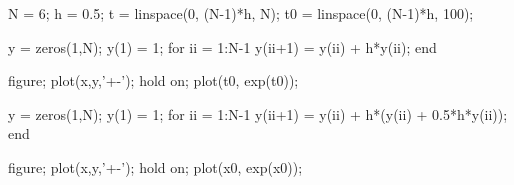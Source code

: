 N = 6;
h = 0.5;
t = linspace(0, (N-1)*h, N); %
t0 = linspace(0, (N-1)*h, 100); %

y = zeros(1,N); %
y(1) = 1; %
for ii = 1:N-1
    y(ii+1) = y(ii) + h*y(ii);
end

figure;
plot(x,y,'+-');
hold on;
plot(t0, exp(t0));

y = zeros(1,N);
y(1) = 1;
for ii = 1:N-1
    y(ii+1) = y(ii) + h*(y(ii) + 0.5*h*y(ii));
end

figure;
plot(x,y,'+-');
hold on;
plot(x0, exp(x0));
